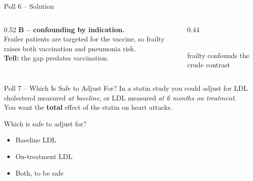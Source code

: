 \documentclass[aspectratio=169]{beamer}
\begin{document}
\begin{frame}{Poll 6 \;--\; Solution}
  \small
  \begin{columns}[T]
    \begin{column}{0.52\textwidth}
      \textcolor{good}{\textbf{B -- confounding by indication.}}\\[0.4em]
      Frailer patients are targeted for the vaccine, so frailty raises both
      vaccination and pneumonia risk.\\[0.4em]
      \textcolor{accent}{\textbf{Tell:}} the gap predates vaccination.
    \end{column}
    \begin{column}{0.44\textwidth}
      \centering
      \\[0.3em]
      {\scriptsize frailty confounds the crude contrast}
    \end{column}
  \end{columns}
\end{frame}

\begin{frame}{Poll 7 \;--\; Which Is Safe to Adjust For?}
  \small
  In a statin study you could adjust for LDL cholesterol measured \emph{at
  baseline}, or LDL measured \emph{at 6 months on treatment}. You want the
  \textbf{total} effect of the statin on heart attacks.
  \vspace{0.8em}

  Which is safe to adjust for?
  \begin{itemize}
    \item[\textbf{A.}] Baseline LDL
    \item[\textbf{B.}] On-treatment LDL
    \item[\textbf{C.}] Both, to be safe
  \end{itemize}
\end{frame}
\end{document}
